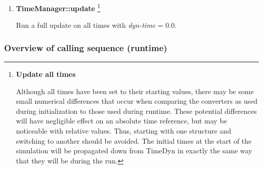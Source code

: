 {\begin{enumerate}
{\begin{enumerate}
{\begin{enumerate}
{\begin{enumerate}  %
\item \textbf{TimeManager::time\_lookup}  \textit{(optional)} \par
Look up the time types by name.

\item \textbf{TimeManager::organize\_update\_list}  \par
Generates the hierarchical list of time types in the order in which they
must be updated.  This is stored in TimeManager.

\item \textbf{TimeConverter::initialize} \textit{(optional)} \par
Called if the necessary time converter has not been called.

\end{enumerate}}  %
\end{enumerate}}  %
\end{enumerate}}  %

\item \textbf{TimeManager::update}
{\footnote{{\bf Update all times}\par
Although all times have been set to their starting values, there
may be some small numerical differences that occur when comparing the
converters as used during initialization to those used during runtime. 
These potential differences will have negligible effect on an absolute
time reference, but may be noticeable with relative values.  Thus,
starting with one structure and switching to another should be avoided.
The initial times at the start of the simulation will be propagated
down from TimeDyn in exactly the same way that they will be during the
run.}} \par


Run a full update on all times with \textit{dyn-time} = 0.0.
\end{enumerate}}  %

\clearpage

\subsubsection{Overview of calling sequence (runtime)}

